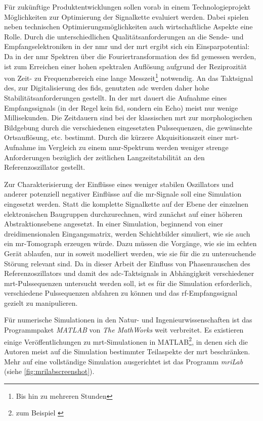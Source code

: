 Für zukünftige Produktentwicklungen sollen vorab in einem Technologie\-projekt Möglich\-keiten zur Optimierung der Signalkette evaluiert werden. Dabei spielen neben technischen Optimierungsmöglichkeiten auch wirtschaftliche Aspekte eine Rolle.
Durch die unterschiedlichen Qualitätsanforderungen an die Sende- und Empfangselektroniken in der \gls{nmr} und der \gls{mrt} ergibt sich ein Einsparpotential: Da in der \gls{nmr} Spektren über die Fouriertransformation des \gls{fid} gemessen werden, ist zum Erreichen einer hohen spektralen Auflösung aufgrund der Reziprozität von Zeit- zu Frequenzbereich eine lange Messzeit\footnote{Bis hin zu mehreren Stunden} notwendig. An das Taktsignal des, zur Digitalisierung des \gls{fid}s, genutzten \gls{adc} werden daher hohe Stabilitätsanforderungen gestellt. In der \gls{mrt} dauert die Aufnahme eines Empfangssignals (in der Regel kein \gls{fid}, sondern ein Echo) meist nur wenige Millisekunden. Die Zeitdauern sind bei der klassischen \gls{mrt} zur morphologischen Bildgebung durch die verschiedenen eingesetzten Pulssequenzen, die gewünschte Ortsauflösung, etc. bestimmt.
Durch die kürzere Akquisitionszeit einer \gls{mrt}-Aufnahme im Vergleich zu einem \gls{nmr}-Spektrum werden weniger strenge Anforderungen bezüglich der zeitlichen Langzeitstabilität an den Referenzoszillator gestellt.

Zur Charakterisierung der Einflüsse eines weniger stabilen Oszillators und anderer potenziell negativer Einflüsse auf die \gls{mr}-Signale soll eine Simulation eingesetzt werden. Statt die komplette Signalkette auf der Ebene der einzelnen elektronischen Baugruppen durchzurechnen, wird zunächst auf einer höheren Abstraktionsebene angesetzt. In einer Simulation, beginnend von einer dreidimensionalen Eingangsmatrix, werden Schichtbilder simuliert, wie sie auch ein \gls{mr}-Tomograph erzeugen würde. Dazu müssen die Vorgänge, wie sie im echten Gerät ablaufen, nur in soweit modelliert werden, wie sie für die zu untersuchende Störung relevant sind. Da in dieser Arbeit der Einfluss von Phasenrauschen des Referenzoszillators und damit des \gls{adc}-Taktsignals in Abhängigkeit verschiedener \gls{mrt}-Pulssequenzen untersucht werden soll, ist es für die Simulation erforderlich, verschiedene Pulssequenzen abfahren zu können und das \gls{rf}-Empfangssignal gezielt zu manipulieren.

Für numerische Simulationen in den Natur- und Ingenieurwissenschaften ist das Programmpaket \textit{MATLAB}\cite{matlab} von \textit{The MathWorks} weit verbreitet. Es existieren einige Ver\-öffent\-lichungen zu \gls{mrt}-Simulationen in MATLAB\footnote{zum Beispiel \cite{Kern2012}}, in denen sich die Autoren meist auf die Simulation bestimmter Teilaspekte der \gls{mrt} beschränken. Mehr auf eine vollständige Simulation ausgerichtet ist das Programm \textit{\gls{mr}iLab}\cite{Liu2017} (siehe \autoref{fig:mrilabscreenshot}).


